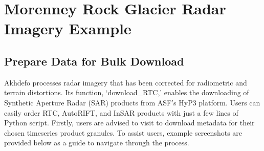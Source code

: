 \documentclass[letterpaper,10pt,english]{sphinxmanual}
\let\sphinxpxdimen\pdfpxdimen\else\newdimen\sphinxpxdimen
\begin{document}
\section{Morenney Rock Glacier Radar Imagery Example}
\label{\detokenize{notebooks/RockGlacier_radar:Morenney-Rock-Glacier-Radar-Imagery-Example}}\label{\detokenize{notebooks/RockGlacier_radar::doc}}

\subsection{Prepare Data for Bulk Download}
\label{\detokenize{notebooks/RockGlacier_radar:Prepare-Data-for-Bulk-Download}}
\sphinxAtStartPar
Akhdefo processes radar imagery that has been corrected for radiometric and terrain distortions. Its function, ‘download\_RTC,’ enables the downloading of Synthetic Aperture Radar (SAR) products from ASF’s HyP3 platform. Users can easily order RTC, AutoRIFT, and InSAR products with just a few lines of Python script. Firstly, users are advised to visit  to download metadata for their chosen time\sphinxhyphen{}series product granules. To assist
users, example screenshots are provided below as a guide to navigate through the process.

\noindent\sphinxincludegraphics[width=1865\sphinxpxdimen,height=957\sphinxpxdimen]{{asf1}.png}

\noindent\sphinxincludegraphics[width=1727\sphinxpxdimen,height=895\sphinxpxdimen]{{asf2}.png}
\end{document}
